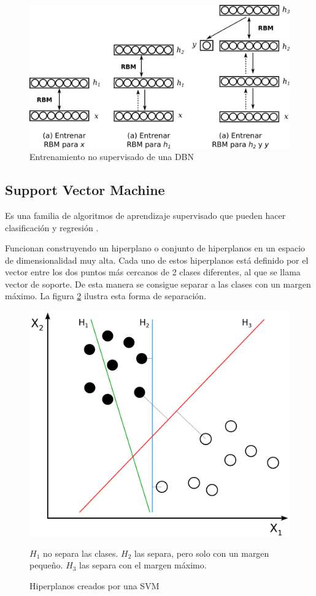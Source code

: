 \begin{figure}[htbp]
	\centering
	\includegraphics[width=0.9\linewidth]{graficos/propios/entrenamiento_dbn.png}
	\caption{Entrenamiento no supervisado de una DBN \citep{beysolow2017autoencoders}}
	\label{fig:dbn-train}
\end{figure}

\subsection{Support Vector Machine}

Es una familia de algoritmos de aprendizaje supervisado que pueden hacer clasificación y regresión \citep{cortes1995support}.

Funcionan construyendo un hiperplano o conjunto de hiperplanos en un espacio de dimensionalidad muy alta. Cada uno de estos hiperplanos está definido por el vector entre los dos puntos más cercanos de 2 clases diferentes, al que se llama vector de soporte. De esta manera se consigue separar a las clases con un margen máximo. La figura \ref{fig:svm-hiperplanos} ilustra esta forma de separación.

\begin{figure}[htbp]
	\centering
	\includegraphics[width=0.4\linewidth]{graficos/svm_hiperplanos.png}
	\caption{Hiperplanos creados por una SVM \citep{wiki:svm_figure}}
	\label{fig:svm-hiperplanos}
	\par
	\small
	$H_1$ no separa las clases. $H_2$ las separa, pero solo con un margen pequeño. $H_3$ las separa con el margen máximo.
\end{figure}

